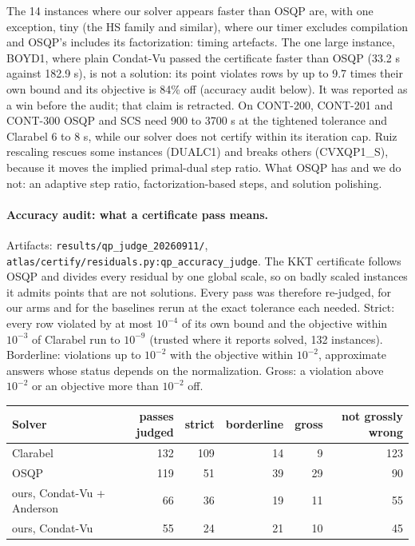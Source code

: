 The 14 instances where our solver appears faster than OSQP are, with one
exception, tiny (the HS family and similar), where our timer excludes
compilation and OSQP's includes its factorization: timing artefacts. The
one large instance, BOYD1, where plain Condat-Vu passed the certificate
faster than OSQP (33.2 s against 182.9 s), is not a solution: its point
violates rows by up to 9.7 times their own bound and its objective is 84\%
off (accuracy audit below). It was reported as a win before the audit; that
claim is retracted. On CONT-200, CONT-201 and
CONT-300 OSQP and SCS need 900 to 3700 s at the tightened tolerance and
Clarabel 6 to 8 s, while our solver does not certify within its iteration
cap. Ruiz rescaling rescues some
instances (DUALC1) and breaks others (CVXQP1\_S), because it moves the
implied primal-dual step ratio. What OSQP has and we do not: an adaptive step
ratio, factorization-based steps, and solution polishing.

\paragraph{Accuracy audit: what a certificate pass means.}
Artifacts: \texttt{results/qp\_judge\_20260911/},
\texttt{atlas/certify/residuals.py:qp\_accuracy\_judge}. The KKT certificate
follows OSQP and divides every residual by one global scale, so on badly
scaled instances it admits points that are not solutions. Every pass was
therefore re-judged, for our arms and for the baselines rerun at the exact
tolerance each needed. Strict: every row violated by at most $10^{-4}$ of its
own bound and the objective within $10^{-3}$ of Clarabel run to $10^{-9}$
(trusted where it reports solved, 132 instances). Borderline: violations up
to $10^{-2}$ with the objective within $10^{-2}$, approximate answers whose
status depends on the normalization. Gross: a violation above $10^{-2}$ or an
objective more than $10^{-2}$ off.

\begin{center}
\small
\begin{tabular}{lrrrrr}
\toprule
Solver & passes judged & strict & borderline & gross & not grossly wrong \\
\midrule
Clarabel & 132 & 109 & 14 & 9 & 123 \\
OSQP & 119 & 51 & 39 & 29 & 90 \\
ours, Condat-Vu + Anderson & 66 & 36 & 19 & 11 & 55 \\
ours, Condat-Vu & 55 & 24 & 21 & 10 & 45 \\
\bottomrule
\end{tabular}
\end{center}

